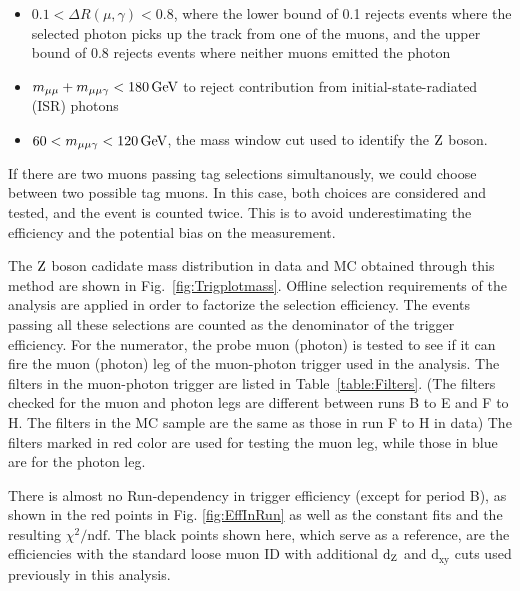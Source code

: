 		\begin{itemize}
		\item $0.1 < \Delta R(\mu ,\gamma) < 0.8$, where the lower bound of 0.1 rejects events where the selected photon picks up the track from one of the muons, and the upper bound of 0.8 rejects events where neither muons emitted the photon
		\item $m_{\mu\mu} + m_{\mu\mu\gamma} < 180\,\text{Ge\hspace{-.08em}V}$ to reject contribution from initial-state-radiated (ISR) photons
		\item $60 < m_{\mu\mu\gamma} < 120\,\text{Ge\hspace{-.08em}V}$, the mass window cut used to identify the $\mathrm{Z}$ boson.
		\end{itemize}
		
		If there are two muons passing tag selections simultanously, we could choose between two possible tag muons. In this case, both choices are considered and tested, and the event is counted twice. This is to avoid underestimating the efficiency and the potential bias on the measurement.
		
	The $\mathrm{Z}$ boson cadidate mass distribution in data and MC obtained through this method are shown in Fig.~\ref{fig:Trigplotmass}. Offline selection requirements of the analysis are applied in order to factorize the selection efficiency. The events passing all these selections are counted as the denominator of the trigger efficiency.  For the numerator, the probe muon (photon) is tested to see if it can fire the muon (photon) leg of the muon-photon trigger used in the analysis. 
	The filters in the muon-photon trigger are listed in Table~\ref{table:Filters}. (The filters checked for the muon and photon legs are different between runs B to E and F to H. The filters in the MC sample are the same as those in run F to H in data)
	The filters marked in red color are used for testing the muon leg, while those in blue are for the photon leg. 
		
		There is almost no Run-dependency in trigger efficiency (except for period B), as shown in the red points in Fig. \ref{fig:EffInRun} as well as the constant fits and the resulting $\chi^{2}/\text{ndf}$. The black points shown here, which serve as a reference, are the efficiencies with the standard loose muon ID with additional $\text{d}_{\mathrm{Z}}$ and $\text{d}_{\text{xy}}$ cuts used previously in this analysis.  
		
